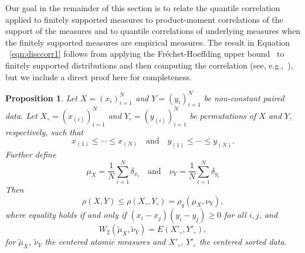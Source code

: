 \documentclass{amsart}
\numberwithin{equation}{section}
\theoremstyle{plain}
\newtheorem{proposition}[subsection]{Proposition}
\theoremstyle{definition}
\begin{document}
Our goal in the remainder of this section is to relate the quantile correlation applied to finitely supported measures to product-moment correlations of the support of the measures and to quantile correlations of underlying measures when the finitely supported measures are empirical measures.
The result in Equation ~\eqref{eqn:disccorr1} follows from applying the Fr\'echet-Hoeffding upper bound~\cite{hoeffding1940masstabinvariante,frechet1951correlation} to finitely supported distributions and then computing the correlation (see, e.g.,~\cite{lin2014recent}), but we include a direct proof here for completeness.
\begin{proposition}\label{prop:sort}
Let $X=(x_i)_{i=1}^N$ and $Y=(y_i)_{i=1}^N$ be non-constant paired data. Let $X_\circ=(x_{(i)})_{i=1}^N$ and $Y_\circ=(y_{(i)})_{i=1}^N$ be permutations of $X$ and $Y$, respectively, such that
\[
x_{(1)} \le \cdots \leq x_{(N)} \quad  \textrm{and} \quad  y_{(1)} \le \cdots \leq y_{(N)}.
\]
Further define
\[
\mu_X = \frac{1}{N} \sum_{i=1}^N \delta_{x_i} \quad \textrm{and} \quad \nu_Y = \frac{1}{N} \sum_{i=1}^N \delta_{y_i}
\]
Then
\begin{equation} \label{eqn:disccorr1}
\rho(X,Y) \leq \rho(X_{\circ},Y_{\circ}) = \rho_q(\mu_X,\nu_Y),
\end{equation}
where equality holds if and only if $(x_i-x_j)(y_i-y_j) \geq 0$ for all $i,j$, and
\[
W_2(\tilde{\mu}_X,\tilde{\nu}_Y) = E(X'_\circ ,Y'_\circ),
\]
for $\tilde{\mu}_X$, $\tilde{\nu}_Y$ the centered atomic measures and $X'_\circ$, $Y'_\circ$ the centered sorted data.
\end{proposition}
\end{document}
